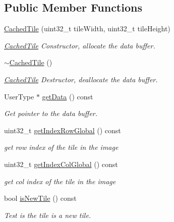 \subsection*{Public Member Functions}
\begin{DoxyCompactItemize}
\item 
\hyperlink{classfi_1_1CachedTile_a1dd05836168d06224fd540d576e4e6e2}{Cached\+Tile} (uint32\+\_\+t tile\+Width, uint32\+\_\+t tile\+Height)
\begin{DoxyCompactList}\small\item\em \hyperlink{classfi_1_1CachedTile}{Cached\+Tile} Constructor, allocate the data buffer. \end{DoxyCompactList}\item 
\hyperlink{classfi_1_1CachedTile_a1fb901c94fe2ad2f880e8eefa893da5d}{$\sim$\+Cached\+Tile} ()
\begin{DoxyCompactList}\small\item\em \hyperlink{classfi_1_1CachedTile}{Cached\+Tile} Destructor, deallocate the data buffer. \end{DoxyCompactList}\item 
User\+Type $\ast$ \hyperlink{classfi_1_1CachedTile_addb4bbc69414fd2e04c1d6f8f9e0b8b7}{get\+Data} () const
\begin{DoxyCompactList}\small\item\em Get pointer to the data buffer. \end{DoxyCompactList}\item 
uint32\+\_\+t \hyperlink{classfi_1_1CachedTile_a970c5b3cb066030fee17e9c60b9814ab}{get\+Index\+Row\+Global} () const
\begin{DoxyCompactList}\small\item\em get row index of the tile in the image \end{DoxyCompactList}\item 
uint32\+\_\+t \hyperlink{classfi_1_1CachedTile_a6e351e6dbc3856d4e3a944eabb615ff9}{get\+Index\+Col\+Global} () const
\begin{DoxyCompactList}\small\item\em get col index of the tile in the image \end{DoxyCompactList}\item 
bool \hyperlink{classfi_1_1CachedTile_ab2d77a5ac2fd2c68038fbce58a4ffb1f}{is\+New\+Tile} () const
\begin{DoxyCompactList}\small\item\em Test is the tile is a new tile. \end{DoxyCompactList}\item 

\end{DoxyCompactItemize}
